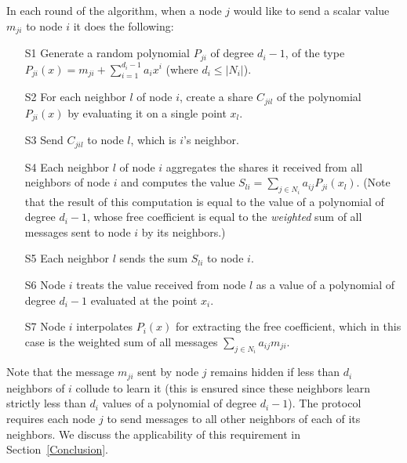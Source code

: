 \documentclass[times, 10pt,twocolumn]{article}
\begin{document}
In each round of the algorithm, when a node $j$ would like to send
a scalar value $m_{ji}$ to node $i$ it does the following:
\begin{itemize}
    \item [S1] Generate a random polynomial $P_{ji}$ of degree
    $d_i-1$, of the type $P_{ji}(x) = m_{ji} + \sum_{i=1}^{d_i-1} a_i
    x^i$\/ (where $d_i \le |N_i| $).
    \item [S2] For each neighbor $l$ of node $i$, create a share $C_{jil}$ of
    the polynomial $P_{ji}(x)$ by evaluating it on a single point
    $x_{l}$.
    \item [S3] Send $C_{jil}$ to node $l$, which is $i$'s
    neighbor.
\item [S4] Each neighbor $l$ of node $i$ aggregates the
      shares it received from all neighbors of node $i$  and computes the value
 $S_{li} = \sum_{j \in N_i} a_{ij} P_{ji}(x_{l})$. (Note
 that the result of this computation is equal to the value of a polynomial of degree $d_i-1$,
 whose free coefficient is equal to the {\em weighted} sum of all messages sent to
 node $i$ by its neighbors.)
    \item [S5] Each neighbor $l$ sends the sum $S_{li}$ to node $i$.
    \item [S6] Node $i$ treats the value received from node $l$ as a
      value of a polynomial of degree $d_i-1$ evaluated at the point
      $x_i$.
    \item [S7] Node $i$ interpolates $P_i(x)$ for extracting the
    free coefficient, which in this case is the weighted sum of all
    messages $\sum_{j \in N_i} a_{ij} m_{ji}$.
\end{itemize}


Note that the message $m_{ji}$ sent by node $j$ remains hidden
if less than  $d_i$ neighbors of $i$ collude to learn
it (this is ensured since these neighbors learn strictly less than $d_i$ values
of a polynomial of degree $d_i-1$).
The protocol requires each node $j$ to send messages to
all other
neighbors of each of its neighbors. We discuss the applicability of this requirement in
Section~\ref{Conclusion}.
\end{document}

